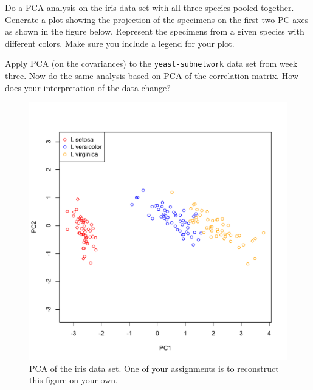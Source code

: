 \begin{assignment}
Do a PCA analysis on the iris data set with all
three species pooled together. Generate a plot showing the projection of
the specimens on the first two PC axes as shown in the figure below.
Represent the specimens from a given species with different colors. Make
sure you include a legend for your plot.

\medskip
Apply PCA (on the covariances) to the \lstinline!yeast-subnetwork! data
set from week three. Now do the same analysis based on PCA of the
correlation matrix. How does your interpretation of the data change?
\end{assignment}


\begin{figure}[htbp]
\centering
\includegraphics[width=0.8\columnwidth]{./figures/hands-on5/iris-all-pca.pdf}
\caption{PCA of the iris data set. One of your assignments is to
reconstruct this figure on your own.}
\end{figure}

